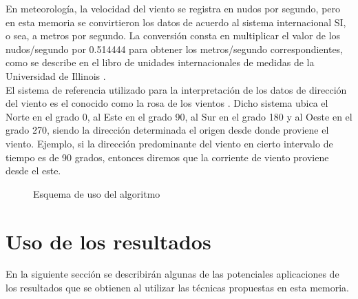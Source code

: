 En meteorología, la velocidad del viento se registra en nudos por segundo, pero en esta memoria se convirtieron los datos de acuerdo al sistema internacional SI, o sea, a metros por segundo. La conversión consta en multiplicar el valor de los nudos/segundo por 0.514444 para obtener los metros/segundo correspondientes, como se describe en el libro de unidades internacionales de medidas de la Universidad de Illinois \cite{KnotsMeterSeconds}.\\
El sistema de referencia utilizado para la interpretación de los datos de dirección del viento es el conocido como la rosa de los vientos \cite{RosaViento}. Dicho sistema ubica el Norte en el grado 0, al Este en el grado 90, al Sur en el grado 180 y al Oeste en el grado 270, siendo la dirección determinada el origen desde donde proviene el viento. Ejemplo, si la dirección predominante del viento en cierto intervalo de tiempo es de 90 grados, entonces diremos que la corriente de viento proviene desde el este.

\begin{figure}[ht!]
\caption{Esquema de uso del algoritmo}

\label{esq:PSO_ALG}
\end{figure}

\section{Uso de los resultados}
En la siguiente sección se describirán algunas de las potenciales aplicaciones de los resultados que se obtienen al utilizar las técnicas propuestas en esta memoria.

